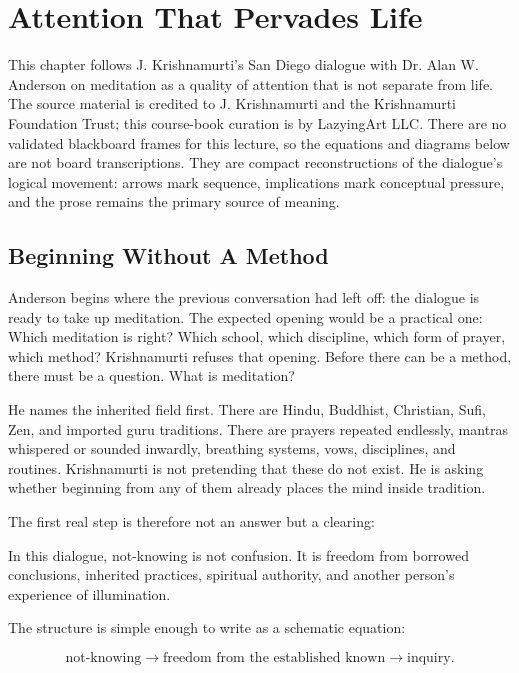 \chapter{Attention That Pervades Life}

This chapter follows J. Krishnamurti's San Diego dialogue with Dr. Alan W. Anderson on meditation as a quality of attention that is not separate from life. The source material is credited to J. Krishnamurti and the Krishnamurti Foundation Trust; this course-book curation is by LazyingArt LLC. There are no validated blackboard frames for this lecture, so the equations and diagrams below are not board transcriptions. They are compact reconstructions of the dialogue's logical movement: arrows mark sequence, implications mark conceptual pressure, and the prose remains the primary source of meaning.

\section{Beginning Without A Method}

Anderson begins where the previous conversation had left off: the dialogue is ready to take up meditation. The expected opening would be a practical one: Which meditation is right? Which school, which discipline, which form of prayer, which method? Krishnamurti refuses that opening. Before there can be a method, there must be a question. What is meditation?

He names the inherited field first. There are Hindu, Buddhist, Christian, Sufi, Zen, and imported guru traditions. There are prayers repeated endlessly, mantras whispered or sounded inwardly, breathing systems, vows, disciplines, and routines. Krishnamurti is not pretending that these do not exist. He is asking whether beginning from any of them already places the mind inside tradition.

The first real step is therefore not an answer but a clearing:

\begin{definition}
In this dialogue, not-knowing is not confusion. It is freedom from borrowed conclusions, inherited practices, spiritual authority, and another person's experience of illumination.
\end{definition}

The structure is simple enough to write as a schematic equation:

\begin{equation}
\text{not-knowing}
\longrightarrow
\text{freedom from the established known}
\longrightarrow
\text{inquiry}.
\end{equation}

